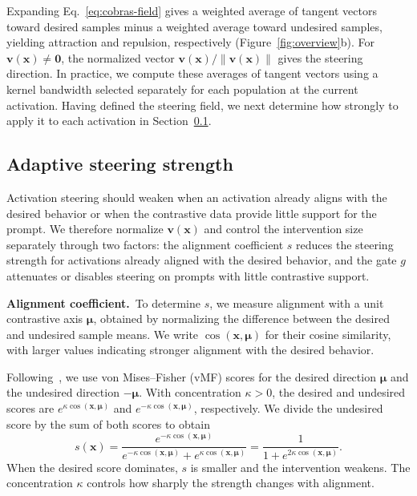 Expanding Eq.~\eqref{eq:cobras-field} gives a weighted average of tangent vectors toward desired samples minus a weighted average toward undesired samples, yielding attraction and repulsion, respectively (Figure~\ref{fig:overview}b). For $\boldsymbol{v}(\boldsymbol{x})\ne\boldsymbol{0}$, the normalized vector $\boldsymbol{v}(\boldsymbol{x})/\|\boldsymbol{v}(\boldsymbol{x})\|$ gives the steering direction. In practice, we compute these averages of tangent vectors using a kernel bandwidth selected separately for each population at the current activation. Having defined the steering field, we next determine how strongly to apply it to each activation in Section~\ref{subsec:strength}.

\subsection{Adaptive steering strength}
\label{subsec:strength}

Activation steering should weaken when an activation already aligns with the desired behavior or when the contrastive data provide little support for the prompt. We therefore normalize $\boldsymbol{v}(\boldsymbol{x})$ and control the intervention size separately through two factors: the alignment coefficient $s$ reduces the steering strength for activations already aligned with the desired behavior, and the gate $g$ attenuates or disables steering on prompts with little contrastive support.

\noindent\textbf{Alignment coefficient.}~To determine $s$, we measure alignment with a unit contrastive axis $\boldsymbol{\mu}$, obtained by normalizing the difference between the desired and undesired sample means. We write $\cos(\boldsymbol{x},\boldsymbol{\mu})$ for their cosine similarity, with larger values indicating stronger alignment with the desired behavior.

Following~\citep{you2026spherical}, we use von Mises--Fisher (vMF) scores for the desired direction $\boldsymbol{\mu}$ and the undesired direction $-\boldsymbol{\mu}$. With concentration $\kappa>0$, the desired and undesired scores are $e^{\kappa\cos(\boldsymbol{x},\boldsymbol{\mu})}$ and $e^{-\kappa\cos(\boldsymbol{x},\boldsymbol{\mu})}$, respectively.  We divide the undesired score by the sum of both scores to obtain
\[
\displaystyle
s(\boldsymbol{x})
=
\frac{e^{-\kappa\cos(\boldsymbol{x},\boldsymbol{\mu})}}
{e^{-\kappa\cos(\boldsymbol{x},\boldsymbol{\mu})}
+e^{\kappa\cos(\boldsymbol{x},\boldsymbol{\mu})}}
=
\frac{1}{1+e^{2\kappa\cos(\boldsymbol{x},\boldsymbol{\mu})}}.
\]
When the desired score dominates, $s$ is smaller and the intervention weakens. The concentration $\kappa$ controls how sharply the strength changes with alignment.

